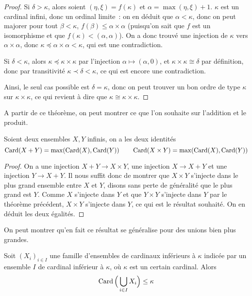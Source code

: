 \begin{proof}
  Si $\delta > \kappa$, alors soient $(\eta,\xi) = f(\kappa)$ et
  $\alpha = \max(\eta,\xi) + 1$. $\kappa$ est un cardinal infini, donc un
  ordinal limite~: on en déduit que $\alpha < \kappa$, donc on peut majorer pour
  tout $\beta < \kappa$, $f(\beta) \leq \alpha \times \alpha$ (puisqu'on sait
  que $f$ est un isomorphisme et que $f(\kappa) < (\alpha,\alpha)$). On a donc
  trouvé une injection de $\kappa$ vers $\alpha \times \alpha$, donc
  $\kappa \preceq \alpha\times \alpha < \kappa$, qui est une contradiction.

  Si $\delta < \kappa$, alors $\kappa \preceq \kappa \times \kappa$ par
  l'injection $\alpha \mapsto (\alpha, 0)$, et $\kappa\times\kappa \cong \delta$
  par définition, donc par transitivité $\kappa \prec \delta < \kappa$, ce
  qui est encore une contradiction.

  Ainsi, le seul cas possible est $\delta = \kappa$, donc on peut trouver un
  bon ordre de type $\kappa$ sur $\kappa\times\kappa$, ce qui revient à dire que
  $\kappa \cong \kappa\times\kappa$.
\end{proof}

A partir de ce théorème, on peut montrer ce que l'on souhaite sur l'addition
et le produit.

\begin{proposition}
  Soient deux ensembles $X,Y$ infinis, on a les deux identités
  \[\operatorname{Card}(X+Y) = \max(\operatorname{Card}(X),\operatorname{Card}(Y))\qquad
  \operatorname{Card}(X\times Y) = \max(\operatorname{Card}(X),\operatorname{Card}(Y))\]
\end{proposition}

\begin{proof}
  On a une injection $X+Y\to X\times Y$, une injection $X\to X + Y$ et une
  injection $Y\to X + Y$. Il nous suffit donc de montrer que
  $X\times Y$ s'injecte dans le plus grand ensemble entre $X$ et $Y$, disons
  sans perte de généralité que le plus grand est $Y$. Comme $X$ s'injecte dans
  $Y$ et que $Y\times Y$ s'injecte dans $Y$ par le théorème précédent,
  $X\times Y$ s'injecte dans $Y$, ce qui est le résultat souhaité. On en déduit
  les deux égalités.
\end{proof}

On peut montrer qu'en fait ce résultat se généralise pour des unions bien plus
grandes.

\begin{proposition}\label{prop.card.union}
  Soit $(X_i)_{i\in I}$ une famille d'ensembles de cardinaux inférieurs à
  $\kappa$ indicée par un ensemble $I$ de cardinal inférieur à $\kappa$, où
  $\kappa$ est un certain cardinal. Alors
  \[\operatorname{Card}\Big(\bigcup_{i\in I} X_i\Big)\leq \kappa\]
\end{proposition}

